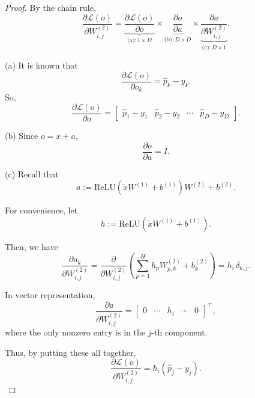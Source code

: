 \begin{proof}
By the chain rule,
\begin{equation}
\frac{\partial \mathcal{L}(o)}{\partial W_{i,j}^{(2)}} = 
    \underbrace{\frac{\partial \mathcal{L}(o)}{\partial o}}_{\text{(a)}: 1 \times D} \times 
    \underbrace{\frac{\partial o}{\partial a}}_{\text{(b)}: D \times D} \times 
    \underbrace{\frac{\partial a}{\partial W_{i,j}^{(2)}}}_{\text{(c)}: D \times 1}.    
\end{equation}

(a) It is known that 
\begin{equation}
    \frac{\partial \mathcal{L}(o)}{\partial o_{k}} = \hat{p}_{k} - y_{k}.
\end{equation}
So,
\begin{equation}
\frac{\partial \mathcal{L}(o)}{\partial o} =   
\begin{bmatrix}
    \hat{p}_{1} - y_{1} & \hat{p}_{2} - y_{2} & \cdots & \hat{p}_{D} - y_{D}
    \end{bmatrix}.
\end{equation}

(b) Since $o = x + a$,
\begin{equation}
    \frac{\partial o}{\partial a} = I.
\end{equation}

(c) Recall that 
\begin{equation}
    a := \mathrm{ReLU}(\tilde{x} W^{(1)} + b^{(1)}) W^{(2)} + b^{(2)}.
\end{equation}

For convenience, let
\begin{equation}
    h := \mathrm{ReLU}(\tilde{x} W^{(1)} + b^{(1)}).
\end{equation}

Then, we have
\begin{equation}
    \frac{\partial a_{k}}{\partial W_{i,j}^{(2)}} = 
    \frac{\partial}{\partial W_{i,j}^{(2)}} 
    \left( \sum_{p=1}^{H} h_{p} W_{p,k}^{(2)} + b_{k}^{(2)} \right) = h_{i} \, \delta_{k,j}.
\end{equation}

In vector representation,
\begin{equation}
    \frac{\partial a}{\partial W_{i,j}^{(2)}} =
    \begin{bmatrix}
    0 & \cdots & h_{i} & \cdots & 0
    \end{bmatrix}^\top,
\end{equation}
where the only nonzero entry is in the $j$-th component.

Thus, by putting these all together,
\begin{equation}
    \frac{\partial \mathcal{L}(o)}{\partial W_{i,j}^{(2)}} = h_{i} (\hat{p}_{j} - y_{j}).    
\end{equation}
\end{proof}



